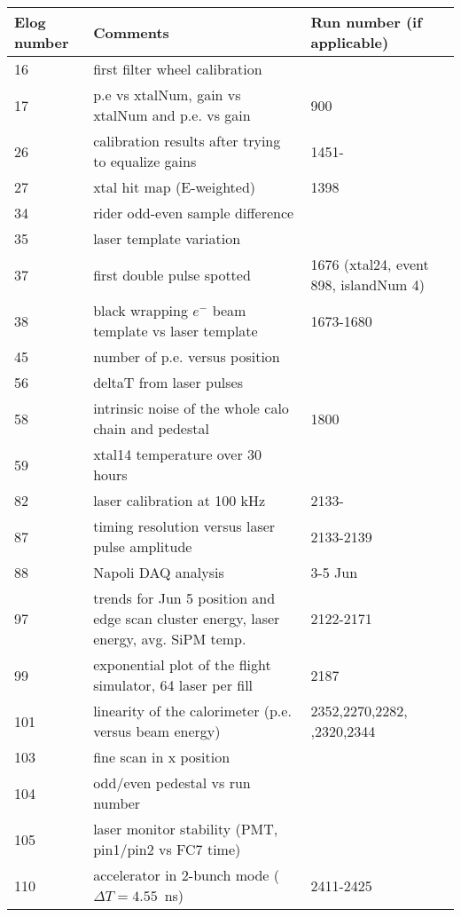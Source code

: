 \begin{longtable}{|p{2.5cm}|p{8cm}|p{4cm}|} \hline
Elog number &  Comments & Run number \newline (if applicable)\\ \hline
16 & first filter wheel calibration & \\ \hline
17 & p.e vs xtalNum, gain vs xtalNum and p.e. vs gain & 900 \\ \hline
26 & calibration results after trying to equalize gains & 1451- \\ \hline
27 & xtal hit map (E-weighted) & 1398 \\ \hline
34 & rider odd-even sample difference & \\ \hline
35 & laser template variation & \\ \hline
37 & first double pulse spotted & 1676 (xtal24, event 898, islandNum 4) \\ \hline
38 & black wrapping $e^{-}$ beam template vs laser template & 1673-1680 \\ \hline
45 & number of p.e. versus position & \\ \hline
56 & deltaT from laser pulses & \\ \hline
58 & intrinsic noise of the whole calo chain and pedestal & 1800 \\ \hline
59 & xtal14 temperature over 30 hours & \\ \hline
82 & laser calibration at 100 kHz & 2133- \\ \hline
87 & timing resolution versus laser pulse amplitude & 2133-2139 \\ \hline
88 & Napoli DAQ analysis & 3-5 Jun \\ \hline
97 & trends for Jun 5 position and edge scan \newline cluster energy, laser energy, avg. SiPM temp. & 2122-2171 \\ \hline
99 & exponential plot of the flight simulator, 64 laser per fill & 2187 \\ \hline
101 & linearity of the calorimeter (p.e. versus beam energy) & 2352,2270,2282, \newline 2308,2320,2344 \\ \hline
103 & fine scan in x position & \\ \hline
104 & odd/even pedestal vs run number & \\ \hline
105 & laser monitor stability (PMT, pin1/pin2 vs FC7 time) & \\ \hline
110 & accelerator in 2-bunch mode ($\Delta T = 4.55$~ns) & 2411-2425 \\ \hline

\end{longtable}
